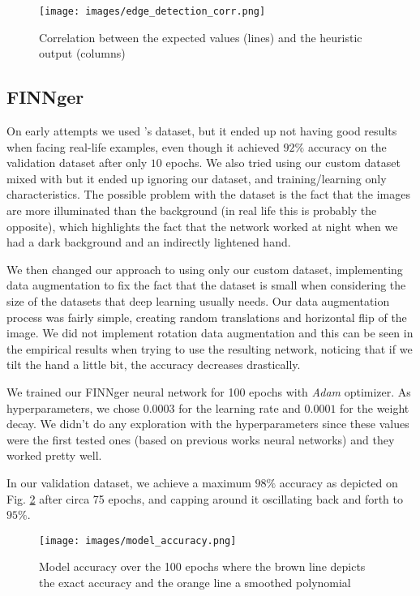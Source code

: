 \documentclass[conference]{IEEEtran}
\begin{document}
\begin{figure}[htbp]
\centerline{\texttt{[image: images/edge\_detection\_corr.png]}}
\caption{Correlation between the expected values (lines) and the heuristic output (columns)}
\label{edge_correlation}
\end{figure}

\subsection{FINNger}
On early attempts we used \cite{b7}'s dataset, but it ended up not having good results when facing real-life examples, even though it achieved $92\%$ accuracy on the validation dataset after only $10$ epochs. We also tried using our custom dataset mixed with \cite{b7} but it ended up ignoring our dataset, and training/learning only \cite{b7} characteristics. The possible problem with the dataset is the fact that the images are more illuminated than the background (in real life this is probably the opposite), which highlights the fact that the network worked at night when we had a dark background and an indirectly lightened hand.

We then changed our approach to using only our custom dataset, implementing data augmentation to fix the fact that the dataset is small when considering the size of the datasets that deep learning usually needs. Our data augmentation process was fairly simple, creating random translations and horizontal flip of the image. We did not implement rotation data augmentation and this can be seen in the empirical results when trying to use the resulting network, noticing that if we tilt the hand a little bit, the accuracy decreases drastically.

We trained our FINNger neural network for 100 epochs with \textit{Adam}\cite{adam} optimizer. As hyperparameters, we chose $0.0003$ for the learning rate and $0.0001$ for the weight decay. We didn't do any exploration with the hyperparameters since these values were the first tested ones (based on previous works neural networks) and they worked pretty well.
 
In our validation dataset, we achieve a maximum $98\%$ accuracy as depicted on Fig. \ref{finnger_accuracy} after circa 75 epochs, and capping around it oscillating back and forth to $95\%$.

\begin{figure}[htbp]
\centerline{\texttt{[image: images/model\_accuracy.png]}}
\caption{Model accuracy over the 100 epochs where the brown line depicts the exact accuracy and the orange line a smoothed polynomial}
\label{finnger_accuracy}
\end{figure}
\end{document}

